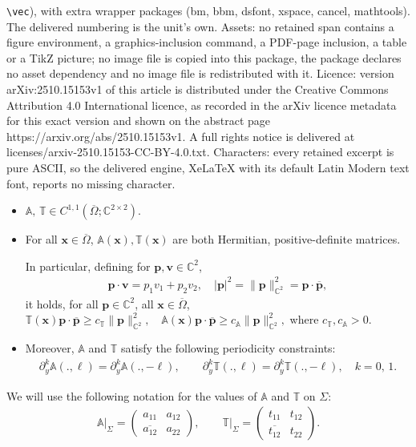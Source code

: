 \documentclass[10pt,a4paper]{amsart}
\newcommand{\bx}{\mathbf{x}}
\renewcommand{\vec}[1]{\mathbf{#1}}
\begin{document}
\texttt{\textbackslash vec}), with extra wrapper packages (bm, bbm, dsfont, xspace, cancel, mathtools). The delivered numbering is the unit's own. Assets: no retained span contains a figure environment, a graphics-inclusion command, a PDF-page inclusion, a table or a TikZ picture; no image file is copied into this package, the package declares no asset dependency and no image file is redistributed with it. Licence: version arXiv:2510.15153v1 of this article is distributed under the Creative Commons Attribution 4.0 International licence, as recorded in the arXiv licence metadata for this exact version and shown on the abstract page https://arxiv.org/abs/2510.15153v1. A full rights notice is delivered at licenses/arxiv-2510.15153-CC-BY-4.0.txt. Characters: every retained excerpt is pure ASCII, so the delivered engine, XeLaTeX with its default Latin Modern text font, reports no missing character.
\begin{assumption}
	\label{assump:matrices}
	\begin{itemize}
		\item $\mathbb{A}, \, \mathbb{T}\in {C}^{1,1}(\overline{\Omega}; \mathbb{C}^{2\times 2})$. 
		\item For all $\bx\in \overline{\Omega}$, $\mathbb{A}(\bx), \mathbb{T}(\bx)$ are both Hermitian, positive-definite matrices. 
		
		
		In particular,
		defining for $\vec{p}, \vec{v}\in \mathbb{C}^2$, 
		\begin{align*}
			\vec{p}\cdot \vec{v}=p_1v_1+p_2v_2,\quad |\vec{p}|^2=\|\vec{p}\|_{\mathbb{C}^2}^2=\vec{p}\cdot\overline{\vec{p}},
		\end{align*}
		it holds, for all $\vec{p}\in \mathbb{C}^2$, all $\vec{x}\in \overline{\Omega}$,  $
		\mathbb{T}(\bx)\vec{p}\cdot\overline{\vec{p}}\geq c_{\mathbb{T}}\|\vec{p}\|^2_{\mathbb{C}^2}, \quad 			\mathbb{A}(\bx)\vec{p}\cdot\overline{\vec{p}}\geq c_{\mathbb{A}}\|\vec{p}\|^2_{\mathbb{C}^2}, $ where $c_{\mathbb{T}}, c_{\mathbb{A}}>0$. 
		\item  Moreover, $\mathbb{A}$ and $\mathbb{T}$ satisfy the following periodicity constraints: 
		\begin{align*}
			\partial_y^k\mathbb{A}(.,\ell)=	\partial_y^k\mathbb{A}(.,-\ell), \qquad 	\partial_y^k\mathbb{T}(.,\ell)=	\partial_y^k\mathbb{T}(.,-\ell), \quad k=0,\,1. 
		\end{align*}
	\end{itemize}
	We will use the following notation for the values of $\mathbb{A}$ and $\mathbb{T}$ on $\Sigma$:
	\begin{align*}
		\left.	\mathbb{A}\right|_{\Sigma}=\left(
		\begin{matrix}
			a_{11} & a_{12}\\
			\overline{a_{12}} & a_{22}
		\end{matrix}
		\right), \qquad \left.	\mathbb{T}\right|_{\Sigma}=\left(
		\begin{matrix}
			t_{11} & t_{12}\\
			\overline{t_{12}} & t_{22}
		\end{matrix}
		\right).
	\end{align*}
\end{assumption}
\end{document}
